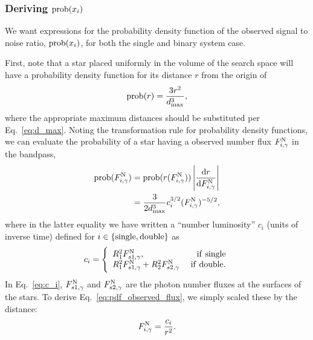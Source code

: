 \documentclass{emulateapj}
\begin{document}
\subsubsection{Deriving ${\rm prob}(x_i)$}
We want expressions for the probability density function of the observed signal 
to noise ratio, ${\rm prob}(x_i)$, for both the single and binary 
system case.

First, note that a star placed uniformly in the volume of the search space will 
have a probability density function for its distance $r$ from the origin of
\begin{equation}
{\rm prob} (r) = \frac{3 r^2}{d_{\rm max}^3},
\end{equation}
where the appropriate maximum distances should be substituted per 
Eq.~\ref{eq:d_max}.
Noting the transformation rule for probability density functions, we can 
evaluate the probability of a star having a observed number flux $F^{\rm 
N}_{i,\gamma}$ in the bandpass,
\begin{align}
{\rm prob} (F^{\rm N}_{i,\gamma}) 
&= {\rm prob}(r(F^{\rm N}_{i,\gamma}))
	\left| \frac{{\rm d} r}{{\rm d} F^{\rm N}_{i,\gamma}} \right| \\
&= \frac{3}{2 d_{\rm max}^3} c_i^{3/2} (F^{\rm N}_{i,\gamma})^{-5/2},
\label{eq:pdf_observed_flux}
\end{align}
where in the latter equality we have written a ``number luminosity'' $c_i$ 
(units of inverse time) defined for $i\in{\rm \{single,double\} }$ as
\begin{equation}
c_i = 
\Bigg\{\begin{array}{lr}
R_1^2 F^{\rm N}_{s1,\gamma}, & {\rm\ if\ single}\\
R_1^2 F^{\rm N}_{s1,\gamma} + R_2^2 F^{\rm N}_{s2,\gamma} & {\rm\ if\ double}.
\end{array}
\label{eq:c_i}
\end{equation}
In Eq.~\ref{eq:c_i}, $F^{\rm N}_{s1,\gamma}$ and $F^{\rm N}_{s2,\gamma}$ are 
the photon number fluxes at the surfaces of the stars. To derive 
Eq.~\ref{eq:pdf_observed_flux}, we simply scaled these by the distance:
\begin{equation}
F^{\rm N}_{i,\gamma} = \frac{c_i}{r^2}.
\label{eq:flux_at_detector}
\end{equation}
\end{document}
